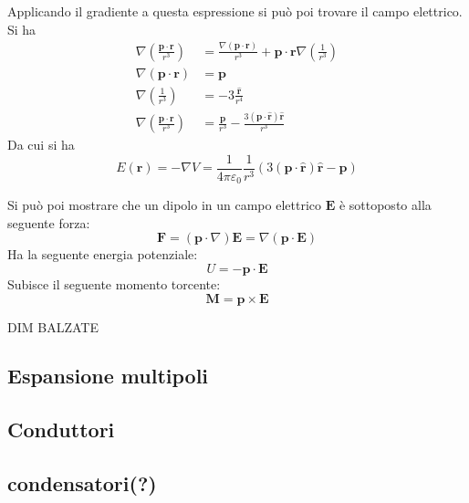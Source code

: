 \documentclass{article}
\renewcommand{\epsilon}{\varepsilon}
\newcommand{\mbf}{\mathbf}
\newcommand{\vers}[1]{\mbf{\hat #1 }}
\newcommand{\qpe}[1][1]{ \frac{ #1 }{ 4\pi\epsilon_0 } }
\numberwithin{equation}{section}
\begin{document}
Applicando il gradiente a questa espressione si può poi trovare il campo elettrico. Si ha 
\begin{align*}
    \nabla \left ( \frac{ \mbf p \cdot \mbf r }{ r^3 } \right ) 
    &= \frac{ \nabla(\mbf p \cdot \mbf r) }{ r^3 } + \mbf p \cdot \mbf r \nabla \left ( \frac{ 1 }{ r^3 } \right ) \\
    \nabla (\mbf p \cdot \mbf r) &= \mbf p \\
    \nabla \left ( \frac{ 1 }{ r^3 } \right ) &= -3 \frac{ \vers r }{ r^4 } \\
    \nabla \left ( \frac{ \mbf p \cdot \mbf r }{ r^3 } \right )  &= \frac{ \mbf p }{ r^3 } - \frac{ 3 ( \mbf p \cdot \vers r) \vers r}{ r^3 }
\end{align*}
Da cui si ha 
\begin{equation}
    E(\mbf r) = -\nabla V = \qpe \frac{ 1 }{ r^3 } ( 3 ( \mbf p \cdot \vers r) \vers r  -  \mbf p )
\end{equation}

Si può poi mostrare che un dipolo in un campo elettrico $\mbf E$ è sottoposto alla seguente forza:
\begin{equation}
    \mbf F = (\mbf p \cdot \nabla ) \mbf E = \nabla ( \mbf{ p \cdot E })
\end{equation}
Ha la seguente energia potenziale:
\begin{equation}
    U = - \mbf{p \cdot E}
\end{equation}
Subisce il seguente momento torcente:
\begin{equation}
    \mbf{ M = p \times E}
\end{equation}

DIM BALZATE


\subsection{Espansione multipoli} %
\label{sub:espansione_multipoli}


\subsection{Conduttori} %
\label{sub:conduttori}


\subsection{condensatori(?)} %
\label{sub:condensatori}
\end{document}
